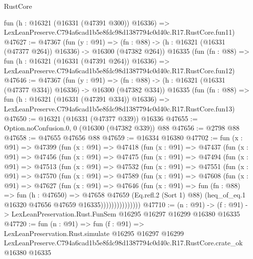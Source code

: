 \begin{lexlean}{RustCore}
\begin{coremodule}
    fun (h : @16321 (@16331 (@47391 @300)) @16336) =>
    LexLeanPreserve.C794a6cad1b5e8fdc98d1387794c0d40c.R17.RustCore.fun11)
@47627 := @47367
    (fun (y : @91) =>
    (fn : @88) -> (h : @16321 (@16331 (@47377 @264)) @16336) -> @16300 (@47382 @264))
    @16335
    (fun (fn : @88) =>
    fun (h : @16321 (@16331 (@47391 @264)) @16336) =>
    LexLeanPreserve.C794a6cad1b5e8fdc98d1387794c0d40c.R17.RustCore.fun12)
@47646 := @47367
    (fun (y : @91) =>
    (fn : @88) -> (h : @16321 (@16331 (@47377 @334)) @16336) -> @16300 (@47382 @334))
    @16335
    (fun (fn : @88) =>
    fun (h : @16321 (@16331 (@47391 @334)) @16336) =>
    LexLeanPreserve.C794a6cad1b5e8fdc98d1387794c0d40c.R17.RustCore.fun13)
@47650 := @16321 (@16331 (@47377 @339)) @16336
@47655 := Option.noConfusion.{0, 0} (@16300 (@47382 @339)) @88
@47656 := @2798 @88
@47658 := @47655 @47656 @88
@47659 := @16334 @16380
@47702 := fun (x : @91) =>
  @47399
    (fun (x : @91) =>
    @47418
      (fun (x : @91) =>
      @47437
        (fun (x : @91) =>
        @47456
          (fun (x : @91) =>
          @47475
            (fun (x : @91) =>
            @47494
              (fun (x : @91) =>
              @47513
                (fun (x : @91) =>
                @47532
                  (fun (x : @91) =>
                  @47551
                    (fun (x : @91) =>
                    @47570
                      (fun (x : @91) =>
                      @47589
                        (fun (x : @91) =>
                        @47608
                          (fun (x : @91) =>
                          @47627
                            (fun (x : @91) =>
                            @47646
                              (fun (x : @91) =>
                              fun (fn : @88) =>
                              fun (h : @47650) =>
                              @47658
                                @47659
                                (Eq.refl.{2} (Sort 1) @88)
                                (heq_of_eq.{1} @16320 @47656 @47659 @16335)))))))))))))))
@47710 := (n : @91) ->
  (f : @91) -> LexLeanPreservation.Rust.FunSem @16295 @16297 @16299 @16380 @16335
@47720 := fun (n : @91) =>
  fun (f : @91) =>
  LexLeanPreservation.Rust.simulate
    @16295
    @16297
    @16299
    LexLeanPreserve.C794a6cad1b5e8fdc98d1387794c0d40c.R17.RustCore.crate_ok
    @16380
    @16335
\end{coremodule}
\end{lexlean}
